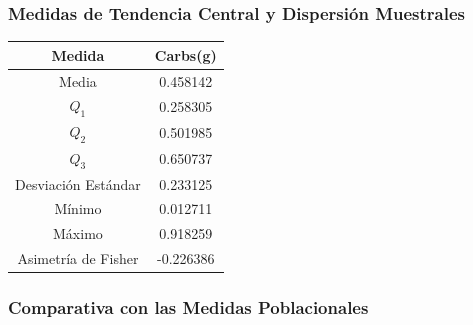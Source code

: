 \documentclass[12pt,a4paper]{article}
\begin{document}
    \subsubsection{Medidas de Tendencia Central y Dispersión Muestrales}
        \begin{center}
            \begin{tabular}{|c|c|}
                \hline
                Medida & Carbs(g) \\
                \hline
                Media & 0.458142  \\
                $Q_1$ & 0.258305 \\
                $Q_2$ & 0.501985 \\
                $Q_3$ & 0.650737 \\
                Desviación Estándar & 0.233125 \\
                Mínimo & 0.012711 \\
                Máximo & 0.918259 \\
                Asimetría de Fisher & -0.226386 \\
                \hline
            \end{tabular}
        \end{center}

    \subsubsection{Comparativa con las Medidas Poblacionales}

\newpage
\end{document}
